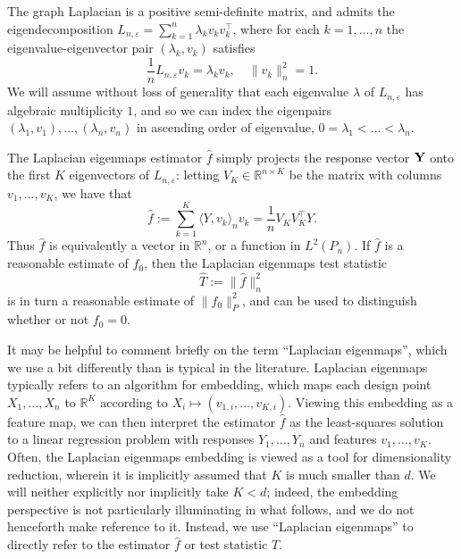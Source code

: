 \documentclass{article}
\newcommand{\Reals}{\mathbb{R}}
\newcommand{\1}{\mathbf{1}}
\newcommand{\dotp}[2]{\langle #1, #2 \rangle}
\newcommand{\wh}[1]{\widehat{#1}}
\theoremstyle{alden}
\theoremstyle{aldenthm}
\theoremstyle{definition}
\theoremstyle{remark}
\begin{document}
The graph Laplacian is a positive semi-definite matrix, and admits the eigendecomposition $L_{n,\varepsilon} = \sum_{k = 1}^{n} \lambda_k v_k v_k^{\top}$, where for each $k = 1,\ldots,n$ the eigenvalue-eigenvector pair $(\lambda_k,v_k)$ satisfies 
\begin{equation*}
\frac{1}{n}L_{n,\varepsilon}v_k = \lambda_k v_k, \quad \|v_k\|_n^2 = 1.
\end{equation*}
We will assume without loss of generality that each eigenvalue $\lambda$ of $L_{n,\varepsilon}$ has algebraic multiplicity $1$, and so we can index the eigenpairs $(\lambda_1,v_1),\ldots,(\lambda_n,v_n)$ in ascending order of eigenvalue, $0 = \lambda_1 < \ldots < \lambda_n$. 

The Laplacian eigenmaps estimator $\wh{f}$ simply projects the response vector ${\bf Y}$ onto the first $K$ eigenvectors of $L_{n,\varepsilon}$: letting $V_K \in \Reals^{n \times K}$ be the matrix with columns $v_1,\ldots,v_K$, we have that
\begin{equation}
\label{eqn:laplacian_eigenmaps_estimator}
\wh{f} := \sum_{k = 1}^{K} \dotp{Y}{v_k}_{n} v_k = \frac{1}{n} V_K V_K^{\top} Y.
\end{equation} 
Thus $\wh{f}$ is equivalently a vector in $\Reals^n$, or a function in $L^2(P_n)$. If $\wh{f}$ is a reasonable estimate of $f_0$, then the Laplacian eigenmaps test statistic
\begin{equation}
\label{eqn:laplacian_eigenmaps_test}
\wh{T} := \|\wh{f}\|_n^2
\end{equation}
is in turn a reasonable estimate of $\|f_0\|_{P}^2$, and can be used to distinguish whether or not $f_0 = 0$.

It may be helpful to comment briefly on the term ``Laplacian eigenmaps'', which we use a bit differently than is typical in the literature. Laplacian eigenmaps typically refers to an algorithm for embedding, which maps each design point $X_1,\ldots,X_n$ to $\Reals^K$ according to $X_i \mapsto (v_{1,i}, \ldots, v_{K,i})$. Viewing this embedding as a feature map, we can then interpret the estimator $\wh{f}$ as the least-squares solution to a linear regression problem with responses $Y_1,\ldots,Y_n$ and features $v_1,\ldots,v_K$. Often, the Laplacian eigenmaps embedding is viewed as a tool for dimensionality reduction, wherein it is implicitly assumed that $K$ is much smaller than $d$. We will neither explicitly nor implicitly take $K < d$; indeed, the embedding perspective is not particularly illuminating in what follows, and we do not henceforth make reference to it. Instead, we use ``Laplacian eigenmaps'' to directly refer to the estimator $\wh{f}$ or test statistic $\wh{T}$. 
\end{document}
